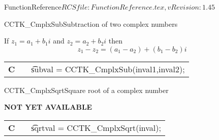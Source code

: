 \begin{cactuspart}{5}{FunctionReference}{$RCSfile: FunctionReference.tex,v $}{$Revision: 1.45 $}
\begin{CCTKFunc}{CCTK\_CmplxSub}{Subtraction of two complex numbers}
\label{CCTK-CmplxSub}
\showcargs
\begin{params}
\end{params}
\begin{discussion}
If $z_1=a_1 + b_1 i$ and $z_2 = a_2+ b_2 i$ then
$$
z_1-z_2 = (a_1-a_2)+ (b_1 - b_2)i
$$
\end{discussion}
\begin{examples}
\begin{tabular}{@{}p{3cm}cp{11cm}}
\hfill {\bf C} && {\t subval = CCTK\_CmplxSub(inval1,inval2)};
\end{tabular}
\end{examples}
\begin{errorcodes}
\end{errorcodes}
\end{CCTKFunc}

\begin{CCTKFunc}{CCTK\_CmplxSqrt}{Square root of a complex number}
\label{CCTK-CmplxSqrt}
\showcargs
\begin{params}
\end{params}
\begin{discussion}
{\bf NOT YET AVAILABLE}
\end{discussion}
\begin{examples}
\begin{tabular}{@{}p{3cm}cp{11cm}}
\hfill {\bf C} && {\t sqrtval = CCTK\_CmplxSqrt(inval)};
\end{tabular}
\end{examples}
\begin{errorcodes}
\end{errorcodes}
\end{CCTKFunc}




\end{cactuspart}
